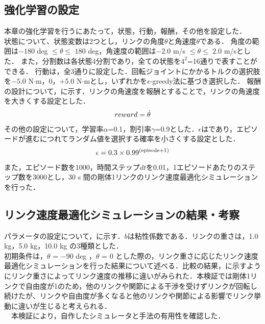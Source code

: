 \begin{small}
\subsection{強化学習の設定}
本章の強化学習を行うにあたって，状態，行動，報酬，その他を設定した．\\
状態について、状態変数は2つとし，リンクの角度$\theta$と角速度$\dot{\theta}$である．
角度の範囲は$-180$ deg $\leq \theta \leq$ $180$ deg，角速度の範囲は$-2.0$ m/s $\leq \dot{\theta} \leq$ $2.0$ m/sとした．
また，分割数は各状態4分割であり，全ての状態を$4^{2}$=16通りで表すことができる．
行動は，全3通りに設定した．回転ジョイントにかかるトルクの選択肢を$-5.0$ N$\cdot$m，$0$，$+5.0$ N$\cdot$mとし，いずれかを$\epsilon$-greedy法に基づき選択した．
報酬の設計について，に示す．リンクの角速度を報酬とすることで，リンクの角速度を大きくする設定とした．
\begin{eqnarray}
  \equlabel{3}
  reward = \dot{\theta}
\end{eqnarray}
その他の設定について，学習率$\alpha$=0.1，割引率$\gamma$=0.9とした．$\epsilon$はであり，エピソードが進むにつれてランダム値を選択する確率を小さくする設定とした．
\begin{eqnarray}
  \equlabel{4}
  \epsilon = 0.3 \times 0.99^{(\mathrm{episode} + 1)}
\end{eqnarray}
また，エピソード数を1000，時間ステップ$dt$を0.01，1エピソードあたりのステップ数を3000とし，30 s 間の剛体1リンクのリンク速度最適化シミュレーションを行った．
\subsection{リンク速度最適化シミュレーションの結果・考察}
パラメータの設定について，に示す．$b$は粘性係数である．リンクの重さは，1.0 kg，5.0 kg，10.0 kg の3種類とした．\\
初期条件は，$\theta$ = $-90$ deg ，$\dot{\theta}$ = 0 とした際の，リンク重さに応じたリンク速度最適化シミュレーションを行った結果について述べる．比較の結果，に示すようにリンク重さによってリンク速度の推移に違いがみられた．本検証では剛体1リンクで自由度が1のため，他のリンクや関節による干渉を受けずリンクが回転し続けたが、リンクや自由度が多くなると他のリンクや関節による影響でリンク挙動に違いが生じると考えられる．\\
　本検証により，自作したシミュレータと手法の有用性を確認した．

\end{small}
